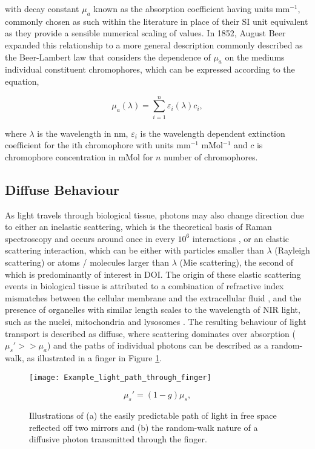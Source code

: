 \documentclass[twoside]{bhamthesis}
\theoremstyle{definition}
\begin{document}
with decay constant $\mu_a$ known as the absorption coefficient having units $\mathrm{mm^{-1}}$, commonly chosen as such within the literature in place of their SI unit equivalent as they provide a sensible numerical scaling of values. In 1852, August Beer expanded this relationship to a more general description commonly described as the Beer-Lambert law that considers the dependence of $\mu_a$ on the mediums individual constituent chromophores, which can be expressed according to the equation,

\begin{equation}
\mu _a (\lambda) = \sum_{i=1}^n \varepsilon_i (\lambda) c_i ,
  \label{eqn:RTE}
\end{equation}

where $\lambda$ is the wavelength in nm, $\varepsilon_i$ is the wavelength dependent extinction coefficient for the ith chromophore with units mm$^{-1}$ mMol$^{-1}$ and $c$ is chromophore concentration in mMol for $n$ number of chromophores.

\subsection{Diffuse Behaviour}

As light travels through biological tissue, photons may also change direction due to either an inelastic scattering, which is the theoretical basis of Raman spectroscopy and occurs around once in every $\mathrm{10^6}$ interactions \cite{long1977raman}, or an elastic scattering interaction, which can be either with particles smaller than $\lambda$ (Rayleigh scattering) or atoms / molecules larger than $\lambda$ (Mie scattering), the second of which is predominantly of interest in DOI. The origin of these elastic scattering events in biological tissue is attributed to a combination of refractive index mismatches between the cellular membrane and the extracellular fluid \cite{mourant2000light}, and the presence of organelles with similar length scales to the wavelength of NIR light, such as the nuclei, mitochondria and lysosomes \cite{mourant2000light,beauvoit1994contribution,marina2012correlating}. The resulting behaviour of light transport is described as diffuse, where scattering dominates over absorption ($\mu_s' >> \mu_a$)  and the paths of individual photons can be described as a random-walk, as illustrated in a finger in Figure \ref{fig:Random_walk}.

\begin{figure}[!ht]
	\begin{minipage}{.7\textwidth}
    \centering
    \texttt{[image: Example\_light\_path\_through\_finger]}
    \caption{Illustrations of (a) the easily predictable path of light in free space reflected off two mirrors and (b) the random-walk nature of a diffusive photon transmitted through the finger.} 
    \label{fig:Random_walk}
  \end{minipage}%
  \begin{minipage}{.3\textwidth}
     \begin{equation}
\mu_s' = (1-g)\mu_s,
  \label{eqn:reduced_scatter}
    \end{equation}
  \end{minipage}
\end{figure}
\end{document}
